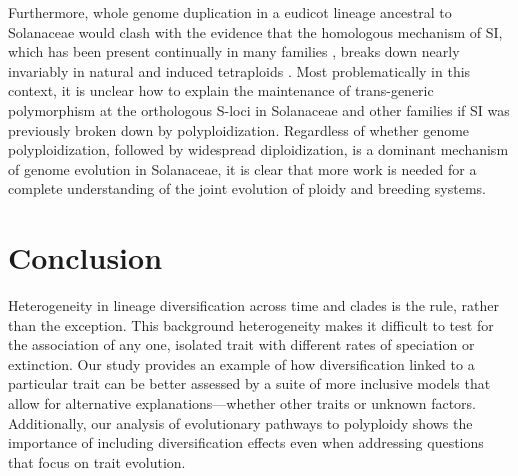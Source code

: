 %
Furthermore, whole genome duplication in a eudicot lineage ancestral to Solanaceae would clash with the evidence that the homologous mechanism of SI, which has been present continually in many families \citep{igic_2006}, breaks down nearly invariably in natural and induced tetraploids \citep{stone_2002, mcclure_2009}.
Most problematically in this context, it is unclear how to explain the maintenance of trans-generic polymorphism at the orthologous S-loci in Solanaceae and other families if SI was previously broken down by polyploidization.
%
Regardless of whether genome polyploidization, followed by widespread diploidization, is a dominant mechanism of genome evolution in Solanaceae, it is clear that more work is needed for a complete understanding of the joint evolution of ploidy and breeding systems.




\section{Conclusion}


Heterogeneity in lineage diversification across time and clades is the rule, rather than the exception.
This background heterogeneity makes it difficult to test for the association of any one, isolated trait with different rates of speciation or extinction.
Our study provides an example of how diversification linked to a particular trait can be better assessed by a suite of more inclusive models that allow for alternative explanations---whether other traits or unknown factors.
Additionally, our analysis of evolutionary pathways to polyploidy shows the importance of including diversification effects even when addressing questions that focus on trait evolution.
